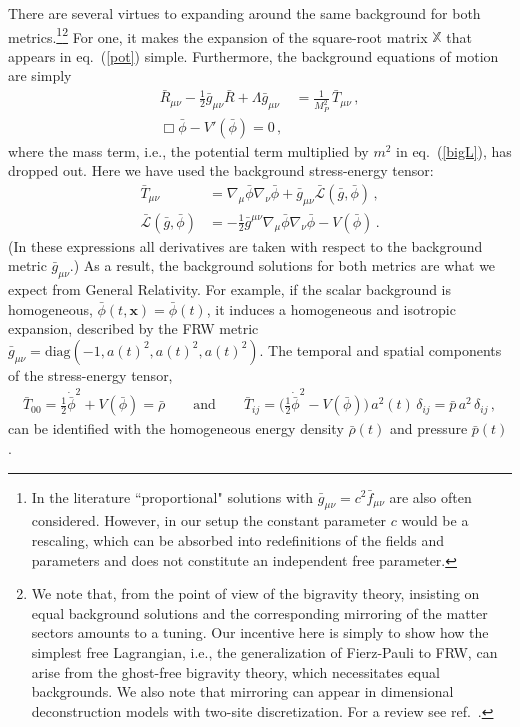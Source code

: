 \documentclass[11pt,a4paper]{article}
\newcommand{\ba}[1]{\begin{align} #1 \end{align}}
\newcommand{\bsa}[2]{\begin{subequations}\label{#1}\begin{align} #2 \end{align}\end{subequations}}
\newcommand{\xvec}{{\bm x}}
\newcommand{\Lcal}{\mathcal{L}}
\newcommand{\MP}{M_P}
\newcommand{\bea}{\begin{eqnarray}}
\newcommand{\eea}{\end{eqnarray}}
\newcommand{\eref}[1]{eq.~(\ref{#1})}
\newcommand{\rref}[1]{ref.~\cite{#1}}
\begin{document}
There are several virtues to expanding around the same background for both metrics.\footnote{In the literature ``proportional" solutions with $\bar{g}_{\mu\nu} = c^2 \bar{f}_{\mu\nu}$ are also often considered.  However, in our setup the constant parameter $c$ would be a rescaling, which can be absorbed into redefinitions of the fields and parameters and does not constitute an independent free parameter.}\footnote{We note that, from the point of view of the bigravity theory, insisting on equal background solutions and the corresponding mirroring of the matter sectors amounts to a tuning. Our incentive here is simply to show how the simplest free Lagrangian, i.e., the generalization of Fierz-Pauli to FRW, can arise from the ghost-free bigravity theory, which necessitates equal backgrounds.  We also note that mirroring can appear in dimensional deconstruction models with two-site discretization.  For a review see \rref{deRham:2014zqa}.}  For one, it makes the expansion of the square-root matrix $\mathbb{X}$ that appears in \eref{pot} simple.  Furthermore, the background equations of motion are simply 
\bsa{eq:model1_bkg_EOM}{
    \bar{R}_{\mu\nu} - \frac{1}{2}\bar{g}_{\mu\nu}\bar{R} + \Lambda \bar{g}_{\mu\nu} & = \frac{1}{\MP^2} \, \bar{T}_{\mu\nu} \label{Einstein_eqn} \, , \\ 
    \Box \bar{\phi} - V'(\bar{\phi}) = 0 \label{phi_eqn} \, ,
}
where the mass term, i.e., the potential term multiplied by $m^2$ in \eref{bigL}, has dropped out.  Here we have used the background stress-energy tensor: 
\ba{
    \bar{T}_{\mu\nu} & = \nabla_\mu \bar{\phi} \nabla_\nu \bar{\phi} + \bar{g}_{\mu\nu} \bar{\Lcal}(\bar{g},\bar{\phi}) \, , \\ 
    \bar{\Lcal}(\bar{g}, \bar{\phi}) & = -\tfrac{1}{2}\bar{g}^{\mu\nu} \nabla_\mu \bar{\phi} \nabla_\nu \bar{\phi} - V(\bar{\phi}) \label{eq:Lbar}
    \, . 
}
(In these expressions all derivatives are taken with respect to the background metric $\bar{g}_{\mu\nu}$.)  As a result, the background solutions for both metrics are what we expect from General Relativity.  For example, if the scalar background is homogeneous, $\bar{\phi}(t,\xvec) = \bar{\phi}(t)$, it induces a homogeneous and isotropic expansion, described by the FRW metric $\bar{g}_{\mu\nu} = \mathrm{diag}(-1, a(t)^2, a(t)^2, a(t)^2)$.  
The temporal and spatial components of the stress-energy tensor, 
\bea
    \bar{T}_{00} 
    = \tfrac{1}{2} \dot{\bar{\phi}}^2 + V(\bar{\phi}) = \bar{\rho} 
    \qquad \text{and} \qquad 
    \bar{T}_{ij} = \bigl( \tfrac{1}{2} \dot{\bar{\phi}}^2 - V(\bar{\phi}) \bigr) \, a^2(t) \, \delta_{ij} = \bar{p} \, a^2 \, \delta_{ij} \, ,
\eea
can be identified with the homogeneous energy density $\bar{\rho}(t)$ and pressure $\bar{p}(t)$.  
\end{document}

